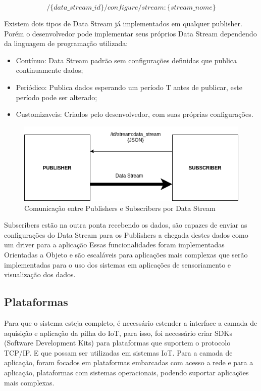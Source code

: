 $$ /\{data\_stream\_id\}/configure/stream:\{stream\_nome\} $$

Existem dois tipos de Data Stream já implementados em qualquer publisher. Porém o desenvolvedor pode implementar seus próprios Data Stream dependendo da linguagem de programação utilizada:

\begin{itemize}
\item Contínuo: Data Stream padrão sem configurações definidas que publica continuamente dados;
\item Periódico: Publica dados esperando um período T antes de publicar, este período pode ser alterado;
\item Customizaveis: Criados pelo desenvolvedor, com suas próprias configurações.
\end{itemize}




\begin{figure}[h!]
\centering
\includegraphics[width=12cm]{./02_Capitulos/02_Cap3/figures/publisher-subscriber_comm}
\caption{Comunicação entre Publishers e Subscribers por Data Stream}
\label{fig:3.2.0/pub_sub}
\end{figure}

Subscribers estão na outra ponta recebendo os dados, são capazes de enviar as configurações do Data Stream para os Publishers a chegada destes dados como um driver para a aplicação
Essas funcionalidades foram implementadas Orientadas a Objeto e são escaláveis para aplicações mais complexas que serão implementadas para o uso dos sistemas em aplicações de sensoriamento e visualização dos dados.

\subsection{Plataformas}
\label{subsection:plataformas}

Para que o sistema esteja completo, é necessário estender a interface a camada de aquisição e aplicação da pilha do IoT, para isso, foi necessário criar SDKs (Software Development Kits) para plataformas que suportem o protocolo TCP/IP. E que possam ser utilizadas em sistemas IoT. Para a camada de aplicação, foram focados em plataformas embarcadas com acesso a rede e para a aplicação, plataformas com sistemas operacionais, podendo suportar aplicações mais complexas.

